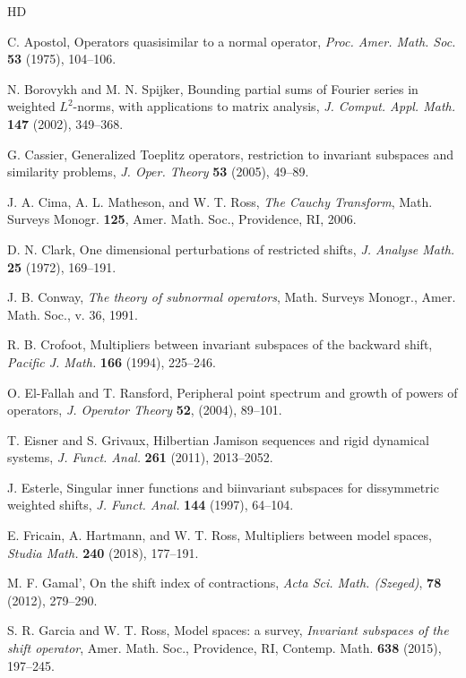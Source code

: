 \documentclass[a4paper,oneside,11pt]{amsart}
\numberwithin{equation}{section}
\theoremstyle{plain}
\theoremstyle{definition}
\begin{document}
\begin{thebibliography}{HD}

\normalsize
\baselineskip=11pt
 C. Apostol, Operators quasisimilar to a normal operator, \emph{Proc. Amer. Math. Soc.}  {\bf 53} (1975), 104--106.

 N. Borovykh and  M. N. Spijker, Bounding partial sums of Fourier series in weighted $L^2$-norms, with applications to matrix analysis, 
\emph{J. Comput. Appl. Math.}  {\bf 147} (2002), 349--368.

 G. Cassier, Generalized Toeplitz operators, restriction to invariant subspaces and similarity problems,  \emph{J. Oper. Theory} {\bf 53} (2005),  49--89.

J. A. Cima, A. L. Matheson, and W. T. Ross,  \emph{The Cauchy Transform}, Math. Surveys
Monogr. {\bf 125}, Amer. Math. Soc., Providence, RI, 2006.

 D. N. Clark, One dimensional perturbations of restricted shifts, \emph{J. Analyse Math.} {\bf25} (1972),      169--191. 

 J. B. Conway, \emph{The theory of subnormal operators}, Math. Surveys 
 Monogr., Amer. Math. Soc., v. 36, 1991.

 R. B. Crofoot, Multipliers between invariant subspaces of the backward shift,
  \emph{ Pacific J. Math.} {\bf 166} (1994), 225--246.

 O. El-Fallah and T. Ransford, Peripheral point spectrum and growth of powers of operators, 
  \emph{J. Operator Theory} {\bf 52}, (2004), 89--101. 

  T. Eisner and S. Grivaux, Hilbertian Jamison sequences and rigid dynamical systems, 
 \emph{J. Funct. Anal.}  {\bf 261} (2011), 2013--2052.

 J. Esterle, Singular inner functions and biinvariant subspaces 
for dissymmetric weighted shifts,
 \emph{ J. Funct.  Anal.} {\bf 144} (1997), 64--104.

 E. Fricain, A. Hartmann, and W. T. Ross, Multipliers between model spaces,
 \emph{ Studia Math.} {\bf240} (2018), 177--191. 

  M. F. Gamal', On the shift index of contractions, \emph{Acta Sci. Math. (Szeged)}, {\bf 78} (2012), 279--290.

 S. R. Garcia and  W. T. Ross, Model spaces: a survey, 
 \emph{Invariant subspaces of the shift operator}, Amer. Math. Soc., Providence, RI, Contemp. Math. {\bf 638} (2015), 197--245. 


\end{thebibliography}
\end{document}
